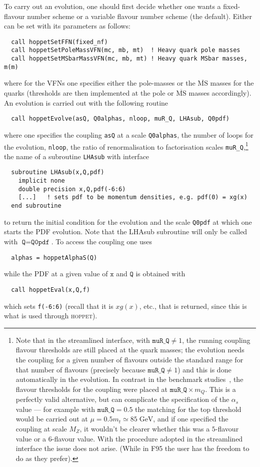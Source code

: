 \documentclass[12pt]{article}
\newcommand{\GeV}{\;\mathrm{GeV}}
\newcommand{\as}{\alpha_s}
\newcommand{\MSbar}{\overline{\mathrm{MS}}}
\newcommand{\hoppet}{\textsc{hoppet}\xspace}
\newcommand{\ttt}[1]{\texttt{#1}}
\begin{document}
To carry out an evolution, one should first decide whether one wants a
fixed-flavour number scheme or a variable flavour number scheme (the
default). Either can be set with its parameters as follows:
\begin{lstlisting}
  call hoppetSetFFN(fixed_nf)
  call hoppetSetPoleMassVFN(mc, mb, mt)  ! Heavy quark pole masses
  call hoppetSetMSbarMassVFN(mc, mb, mt) ! Heavy quark MSbar masses, m(m)
\end{lstlisting}
where for the VFNs one specifies either the pole-masses or the
$\MSbar$ masses for the quarks (thresholds are then implemented at the
pole or $\MSbar$ masses accordingly). An evolution is carried out with
the following routine
\begin{lstlisting}
  call hoppetEvolve(asQ, Q0alphas, nloop, muR_Q, LHAsub, Q0pdf)
\end{lstlisting}
where one specifies the coupling \ttt{asQ} at a scale \ttt{Q0alphas},
the number of loops for the evolution, \ttt{nloop}, the ratio of
renormalisation to factorisation scales \ttt{muR\_Q},\footnote{Note
  that in the streamlined interface, with $\ttt{muR\_Q}\ne 1$, the running
  coupling flavour thresholds are still placed at the quark masses;
  the evolution needs the coupling for a given number of flavours
  outside the standard range for that number of flavours (precisely
  because $\ttt{muR\_Q}\ne 1$) and this is done automatically in the
  evolution. In contrast in the benchmark studies~\cite{Benchmarks},
  the flavour thresholds for the coupling were placed at $\ttt{muR\_Q}
  \times m_Q$.  This is a perfectly valid alternative, but can
  complicate the specification of the $\as$ value --- for example with
  $\ttt{muR\_Q} = 0.5$ the matching for the top threshold would be
  carried out at $\mu = 0.5 m_t \simeq 85 \GeV$, and if one specified
  the coupling at scale $M_Z$, it wouldn't be clearer whether this was
  a $5$-flavour value or a $6$-flavour value. With the procedure
  adopted in the streamlined interface the issue does not arise. (While in
  F95 the user has the freedom to do as they prefer). } %
the name of a subroutine \ttt{LHAsub} with interface
\begin{lstlisting}
  subroutine LHAsub(x,Q,pdf)
    implicit none
    double precision x,Q,pdf(-6:6)
    [...]   ! sets pdf to be momentum densities, e.g. pdf(0) = xg(x)
  end subroutine 
\end{lstlisting}
to return the initial condition for the evolution and the scale
\ttt{Q0pdf} at which one starts the PDF evolution. Note that the
LHAsub subroutine will only be called with $\ttt{Q}=\ttt{Q0pdf}$.
To access the coupling one uses
\begin{lstlisting}
  alphas = hoppetAlphaS(Q)
\end{lstlisting}
while the PDF at a given value of $\ttt{x}$ and $\ttt{Q}$ is obtained with 
\begin{lstlisting}
  call hoppetEval(x,Q,f)
\end{lstlisting}
which sets \ttt{f(-6:6)} (recall that it is $xg(x)$, etc., that is
returned, since this is what is
used through \hoppet).
\end{document}
